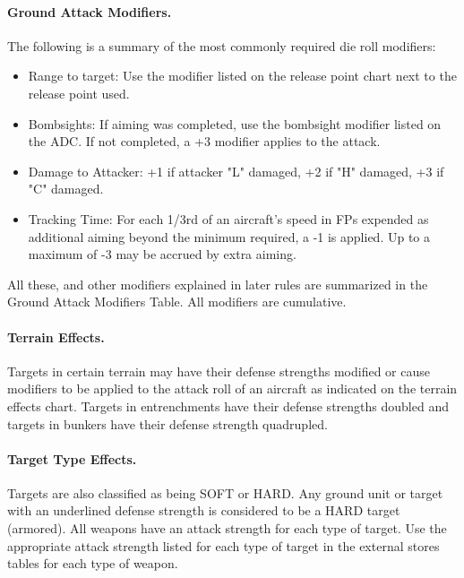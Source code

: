 \paragraph{Ground Attack Modifiers.} The following is a summary of the most commonly required die roll modifiers:
\begin{itemize}
    \item Range to target: Use the modifier listed on the release point chart next to the release point used.
    \item Bombsights: If aiming was completed, use the bombsight modifier listed on the ADC. If not completed, a +3 modifier applies to the attack.
    \item Damage to Attacker: +1 if attacker "L" damaged, +2 if "H" damaged, +3 if "C" damaged.
    \item Tracking Time: For each 1/3rd of an aircraft's speed in FPs expended as additional aiming beyond the minimum required, a -1 is applied. Up to a maximum of -3 may be accrued by extra aiming.
\end{itemize}

All these, and other modifiers explained in later rules are summarized in the Ground Attack Modifiers Table. All modifiers are cumulative.

\paragraph{Terrain Effects.} Targets in certain terrain may have their defense strengths modified or cause modifiers to be applied to the attack roll of an aircraft as indicated on the terrain effects chart. Targets in entrenchments have their defense strengths doubled and targets in bunkers have their defense strength quadrupled.

\paragraph{Target Type Effects.} Targets are also classified as being SOFT or HARD. Any ground unit or target with an underlined defense strength is considered to be a HARD target (armored). All weapons have an attack strength for each type of target. Use the appropriate attack strength listed for each type of target in the external stores tables for each type of weapon.


